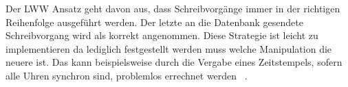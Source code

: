 Der \gls{LWW} Ansatz geht davon aus, dass Schreibvorgänge immer in der richtigen Reihenfolge ausgeführt werden. Der letzte an die Datenbank gesendete Schreibvorgang wird als korrekt angenommen.
Diese Strategie ist leicht zu implementieren da lediglich festgestellt werden muss welche Manipulation die neuere ist.
Das kann beispielsweise durch die Vergabe eines Zeitstempels, sofern alle Uhren synchron sind, problemlos errechnet werden ~\cite{lww}.
